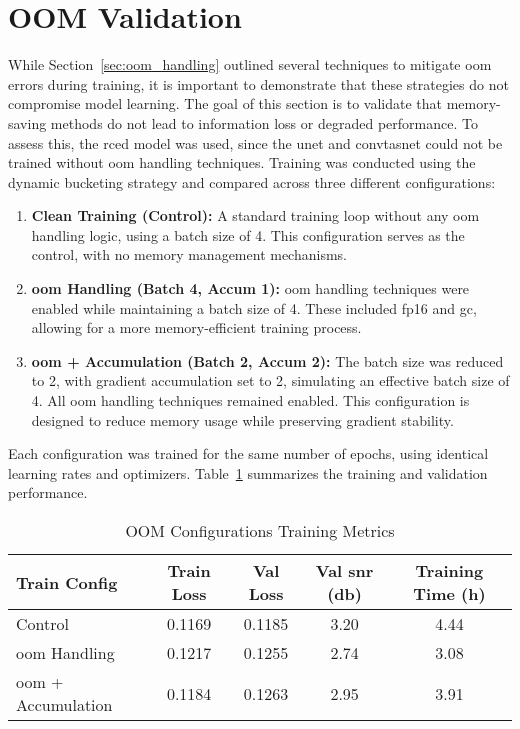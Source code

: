 \section{OOM Validation}
\label{sec:oom_validation}

While Section~\ref{sec:oom_handling} outlined several techniques to mitigate \gls{oom} errors during training, it is important to demonstrate that these strategies do not compromise model learning. The goal of this section is to validate that memory-saving methods do not lead to information loss or degraded performance. To assess this, the \gls{rced} model was used, since the \gls{unet} and \gls{convtasnet} could not be trained without \gls{oom} handling techniques. Training was conducted using the dynamic bucketing strategy and compared across three different configurations:

\begin{enumerate}
    \item \textbf{Clean Training (Control):} A standard training loop without any \gls{oom} handling logic, using a batch size of 4. This configuration serves as the control, with no memory management mechanisms.
    
    \item \textbf{\gls{oom} Handling (Batch 4, Accum 1):} \gls{oom} handling techniques were enabled while maintaining a batch size of 4. These included \gls{fp16} and \gls{gc}, allowing for a more memory-efficient training process.
    
    \item \textbf{\gls{oom} + Accumulation (Batch 2, Accum 2):} The batch size was reduced to 2, with gradient accumulation set to 2, simulating an effective batch size of 4. All \gls{oom} handling techniques remained enabled. This configuration is designed to reduce memory usage while preserving gradient stability.
\end{enumerate}

Each configuration was trained for the same number of epochs, using identical learning rates and optimizers. Table~\ref{tab:oom_training} summarizes the training and validation performance.

\vspace{1em}
\begin{table}[H]
\centering
\caption{OOM Configurations Training Metrics}
\label{tab:oom_training}
\begin{tabular}{|l|c|c|c|c|}
\hline
\textbf{Train Config} & \textbf{Train Loss} & \textbf{Val Loss} & \textbf{Val \gls{snr} (db)} & \textbf{Training Time (h)} \\
\hline
Control                      & 0.1169 & 0.1185 & 3.20  & 4.44 \\
\gls{oom} Handling           & 0.1217 & 0.1255 & 2.74  & 3.08 \\
\gls{oom} + Accumulation     & 0.1184 & 0.1263 & 2.95  & 3.91 \\
\hline
\end{tabular}
\end{table}

